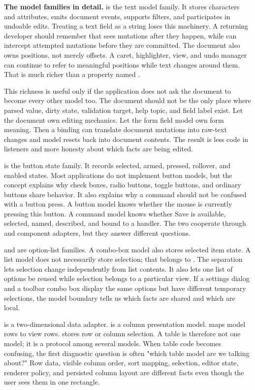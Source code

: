 \textbf{The model families in detail.}  is the text model family. It stores characters and attributes, emits document events, supports filters, and participates in undoable edits. Treating a text field as a string loses this machinery. A returning developer should remember that  sees mutations after they happen, while  can intercept attempted mutations before they are committed. The document also owns positions, not merely offsets. A caret, highlighter, view, and undo manager can continue to refer to meaningful positions while text changes around them. That is much richer than a property named .

This richness is useful only if the application does not ask the document to become every other model too. The document should not be the only place where parsed value, dirty state, validation target, help topic, and field label exist. Let the document own editing mechanics. Let the form field model own form meaning. Then a binding can translate document mutations into raw-text changes and model resets back into document contents. The result is less code in listeners and more honesty about which facts are being edited.

 is the button state family. It records selected, armed, pressed, rollover, and enabled states. Most applications do not implement button models, but the concept explains why check boxes, radio buttons, toggle buttons, and ordinary buttons share behavior. It also explains why a command should not be confused with a button press. A button model knows whether the mouse is currently pressing this button. A command model knows whether Save is available, selected, named, described, and bound to a handler. The two cooperate through  and component adapters, but they answer different questions.

 and  are option-list families. A combo-box model also stores selected item state. A list model does not necessarily store selection; that belongs to . The separation lets selection change independently from list contents. It also lets one list of options be reused while selection belongs to a particular view. If a settings dialog and a toolbar combo box display the same options but have different temporary selections, the model boundary tells us which facts are shared and which are local.

 is a two-dimensional data adapter.  is a column presentation model.  maps model rows to view rows.  stores row or column selection. A table is therefore not one model; it is a protocol among several models. When table code becomes confusing, the first diagnostic question is often "which table model are we talking about?" Row data, visible column order, sort mapping, selection, editor state, renderer policy, and persisted column layout are different facts even though the user sees them in one rectangle.

